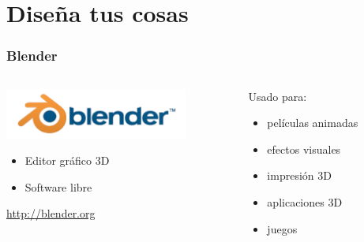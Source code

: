 %
%

\section{Diseña tus cosas}

\begin{frame}
\frametitle{Blender}

\begin{columns}[T]
\begin{column}{.48\textwidth}
\includegraphics[width=6cm]{figs/blender-logo}

\vspace{.5cm}

{\Large
  \begin{itemize}
  \item Editor gráfico 3D
  \item Software libre
  \end{itemize}

\vspace{.5cm}

\begin{flushright}
\url{http://blender.org}
\end{flushright}
}

\end{column}%
\hfill%
\begin{column}{.60\textwidth}
  {\Large
    \begin{center}
      Usado para:
    \end{center}
    \begin{itemize}
    \item películas animadas
    \item efectos visuales
    \item impresión 3D
    \item aplicaciones 3D
    \item juegos
    \end{itemize}
  }
\end{column}%
\end{columns}

\end{frame}

